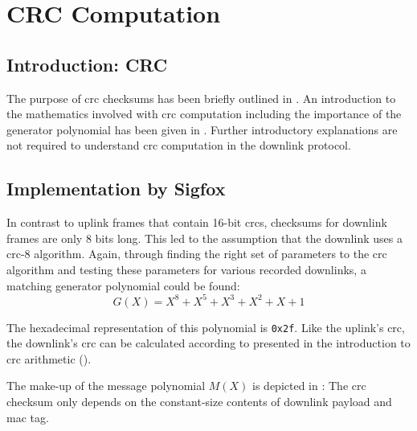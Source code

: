 \section{CRC Computation}
\subsection{Introduction: CRC}
The purpose of \gls{crc} checksums has been briefly outlined in .
An introduction to the mathematics involved with \gls{crc} computation including the importance of the generator polynomial has been given in .
Further introductory explanations are not required to understand \gls{crc} computation in the downlink protocol.

\subsection{Implementation by Sigfox}
In contrast to uplink frames that contain 16-bit \glspl{crc}, checksums for downlink frames are only 8 bits long.
This led to the assumption that the downlink uses a \gls{crc}-8 algorithm.
Again, through finding the right set of parameters to the \gls{crc} algorithm and testing these parameters for various recorded downlinks, a matching generator polynomial could be found:
\begin{equation}
	G(X) = X^8 + X^5 + X^3 + X^2 + X + 1
\end{equation}

The hexadecimal representation of this polynomial is \texttt{0x2f}.
Like the uplink's \gls{crc}, the downlink's \gls{crc} can be calculated according to  presented in the introduction to \gls{crc} arithmetic ().

The make-up of the message polynomial $M(X)$ is depicted in :
The \gls{crc} checksum only depends on the constant-size contents of downlink payload and \gls{mac} tag.

